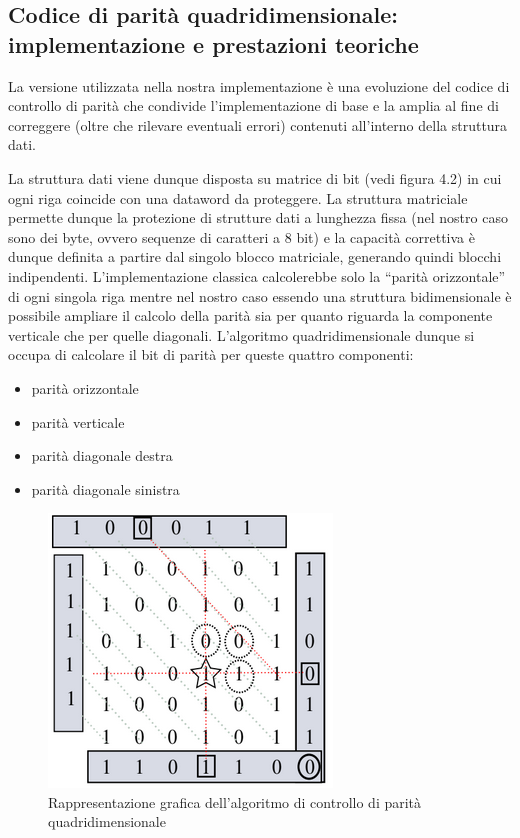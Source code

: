 \documentclass[LaM,binding=0.6cm,oneside]{../sapthesis}
\begin{document}
\subsection{Codice di parità quadridimensionale: implementazione e prestazioni teoriche}

La versione utilizzata nella nostra implementazione è una evoluzione del codice di controllo di parità che condivide l’implementazione di base e la amplia al fine di correggere (oltre che rilevare eventuali errori) contenuti all’interno della struttura dati.

La struttura dati viene dunque disposta su matrice di bit (vedi figura 4.2) in cui ogni riga coincide con una dataword da proteggere.
La struttura matriciale permette dunque la protezione di strutture dati a lunghezza fissa (nel nostro caso sono dei byte, ovvero sequenze di caratteri a 8 bit) e la capacità correttiva è dunque definita a partire dal singolo blocco matriciale, generando quindi blocchi indipendenti.
L’implementazione classica calcolerebbe solo la “parità orizzontale” di ogni singola riga mentre nel nostro caso essendo una struttura bidimensionale è possibile ampliare il calcolo della parità sia per quanto riguarda la componente verticale che per quelle diagonali.
L’algoritmo quadridimensionale dunque si occupa di calcolare il bit di parità per queste quattro componenti:
\begin{itemize}
    \item parità orizzontale
    \item parità verticale
    \item parità diagonale destra
    \item parità diagonale sinistra
\end{itemize}

\begin{figure}[htbp]
\centerline{\includegraphics[scale=0.9]{examples/parita4D.PNG}}
\caption{Rappresentazione grafica dell'algoritmo di controllo di parità quadridimensionale}
\label{fig}
\end{figure}
\newline
\end{document}
